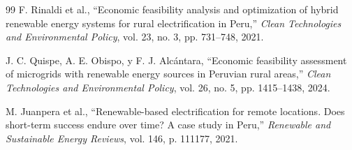 \begin{thebibliography}{99}
F. Rinaldi et al., ``Economic feasibility analysis and optimization of hybrid renewable energy systems for rural electrification in Peru,'' \textit{Clean Technologies and Environmental Policy}, vol. 23, no. 3, pp. 731--748, 2021.

J. C. Quispe, A. E. Obispo, y F. J. Alcántara, ``Economic feasibility assessment of microgrids with renewable energy sources in Peruvian rural areas,'' \textit{Clean Technologies and Environmental Policy}, vol. 26, no. 5, pp. 1415--1438, 2024.

M. Juanpera et al., ``Renewable-based electrification for remote locations. Does short-term success endure over time? A case study in Peru,'' \textit{Renewable and Sustainable Energy Reviews}, vol. 146, p. 111177, 2021.

\end{thebibliography}
